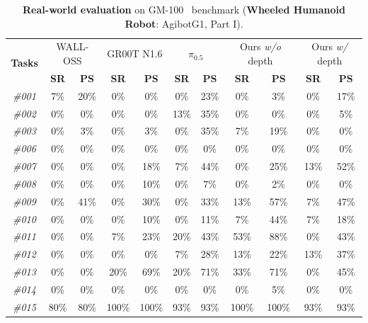 \begin{table}[t]
  \centering
  \caption{\textbf{Real-world evaluation} on GM-100~\cite{gm100} benchmark (\textbf{Wheeled Humanoid Robot}: AgibotG1, Part I).}
  \small
  \setlength{\tabcolsep}{12pt}
    \begin{tabular}{ccccccccccc}
    \toprule
    \multirow{2}[2]{*}{\textbf{Tasks}} & \multicolumn{2}{c}{WALL-OSS} & \multicolumn{2}{c}{GR00T N1.6} & \multicolumn{2}{c}{$\pi_{0.5}$} & \multicolumn{2}{c}{Ours \textit{w/o} depth} & \multicolumn{2}{c}{Ours \textit{w/} depth} \\
          & \textbf{SR} & \textbf{PS} & \textbf{SR} & \textbf{PS} & \textbf{SR} & \textbf{PS} & \textbf{SR} & \textbf{PS} & \textbf{SR} & \textbf{PS} \\
    \midrule
    \textit{\#001} & 7\%   & 20\%  & 0\%   & 0\%   & 0\%   & 23\%  & 0\%   & 3\%   & 0\%   & 17\% \\
    \textit{\#002} & 0\%   & 0\%   & 0\%   & 0\%   & 13\%  & 35\%  & 0\%   & 0\%   & 0\%   & 5\% \\
    \textit{\#003} & 0\%   & 3\%   & 0\%   & 3\%   & 0\%   & 35\%  & 7\%   & 19\%  & 0\%   & 0\% \\
    \textit{\#006} & 0\%   & 0\%   & 0\%   & 0\%   & 0\%   & 0\%   & 0\%   & 0\%   & 0\%   & 0\% \\
    \textit{\#007} & 0\%   & 0\%   & 0\%   & 18\%  & 7\%   & 44\%  & 0\%   & 25\%  & 13\%  & 52\% \\
    \textit{\#008} & 0\%   & 0\%   & 0\%   & 10\%  & 0\%   & 7\%   & 0\%   & 2\%   & 0\%   & 0\% \\
    \textit{\#009} & 0\%   & 41\%  & 0\%   & 30\%  & 0\%   & 33\%  & 13\%  & 57\%  & 7\%   & 47\% \\
    \textit{\#010} & 0\%   & 0\%   & 0\%   & 10\%  & 0\%   & 11\%  & 7\%   & 44\%  & 7\%   & 18\% \\
    \textit{\#011} & 0\%   & 0\%   & 7\%   & 23\%  & 20\%  & 43\%  & 53\%  & 88\%  & 0\%   & 43\% \\
    \textit{\#012} & 0\%   & 0\%   & 0\%   & 0\%   & 7\%   & 28\%  & 13\%  & 22\%  & 13\%  & 37\% \\
    \textit{\#013} & 0\%   & 0\%   & 20\%  & 69\%  & 20\%  & 71\%  & 33\%  & 71\%  & 0\%   & 45\% \\
    \textit{\#014} & 0\%   & 0\%   & 0\%   & 0\%   & 0\%   & 0\%   & 0\%   & 5\%   & 0\%   & 0\% \\
    \textit{\#015} & 80\%  & 80\%  & 100\% & 100\% & 93\%  & 93\%  & 100\% & 100\% & 93\%  & 93\% \\

\end{tabular}
\end{table}
